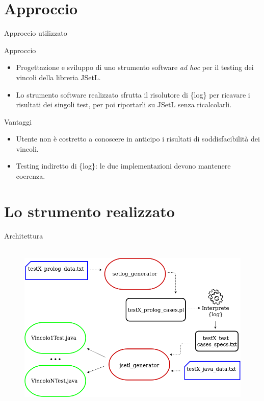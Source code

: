 \documentclass{beamer}
\begin{document}
\section{Approccio}
\begin{frame}{Approccio utilizzato}

        {

        	\begin{block}{Approccio}
        	\begin{itemize}
        	\setlength\itemsep{1em}
        	\item Progettazione e sviluppo di uno strumento software \emph{ad hoc} per il testing dei vincoli della libreria JSetL.
        	\item Lo strumento software realizzato sfrutta il risolutore di \{log\} per ricavare i risultati dei singoli test, per poi riportarli su JSetL senza ricalcolarli.
			\end{itemize}        
        	\end{block}	
        }
        
        {
        	\begin{block}{Vantaggi}
        	\begin{itemize}
        	\setlength\itemsep{1em}
        	\item Utente non \`e costretto a conoscere in anticipo i risultati di soddisfacibilit\`a dei vincoli.
        	\item Testing indiretto di \{log\}: le due implementazioni devono mantenere coerenza.
			\end{itemize}        
        	\end{block}	
        }
\end{frame}

\section{Lo strumento realizzato}

\begin{frame}{Architettura}
	
	\begin{figure}
	\hbox{\hspace{-0.3em} \includegraphics[scale=0.37]{architecture.png}}
	\end{figure}

\end{frame}
\end{document}
